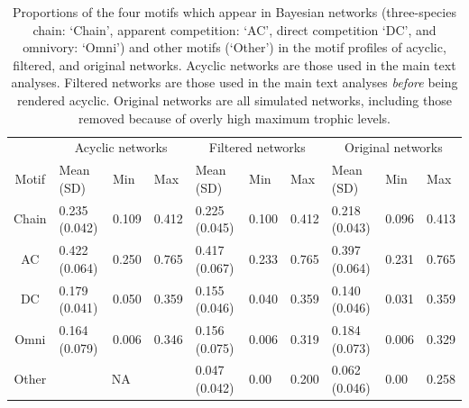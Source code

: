 \documentclass[12pt]{article}
\begin{document}
\begin{spacing}{2.0}
    \begin{table}[h!]
        \centering
        \caption{Proportions of the four motifs which appear in Bayesian networks (three-species chain: `Chain', apparent competition: `AC', direct competition `DC', and omnivory: `Omni') and other motifs (`Other') in the motif profiles of acyclic, filtered, and original networks. Acyclic networks are those used in the main text analyses. Filtered networks are those used in the main text analyses \emph{before} being rendered acyclic. Original networks are all simulated networks, including those removed because of overly high maximum trophic levels.}
        \label{tab:acyclic_proportions}            \footnotesize
        \begin{tabular}{c|l l l | l l l | l l l |}
        & \multicolumn{3}{c|}{Acyclic networks} & \multicolumn{3}{c|}{Filtered networks} & \multicolumn{3}{c|}{Original networks} \\
        Motif & Mean (SD) & Min & Max & Mean (SD) & Min & Max & Mean (SD) & Min & Max \\
        \hline
        Chain & 0.235 (0.042) & 0.109 & 0.412 & 0.225 (0.045) & 0.100 & 0.412 & 0.218 (0.043) & 0.096 & 0.413 \\
        AC & 0.422 (0.064) & 0.250 & 0.765 &
        0.417 (0.067) & 0.233 & 0.765 & 0.397 (0.064) & 0.231 & 0.765 \\
        DC & 0.179 (0.041) & 0.050 & 0.359 & 0.155 (0.046) & 0.040 & 0.359 & 0.140 (0.046) & 0.031 & 0.359 \\
        Omni & 0.164 (0.079) & 0.006 & 0.346 & 0.156 (0.075) & 0.006 & 0.319 & 0.184 (0.073) & 0.006 & 0.329 \\
        \hline
        Other & \multicolumn{3}{c|}{NA} & 0.047 (0.042) & 0.00 & 0.200 &
        0.062 (0.046) & 0.00 & 0.258 \\
        \end{tabular}
    \end{table}



\clearpage




\end{spacing}
\end{document}

